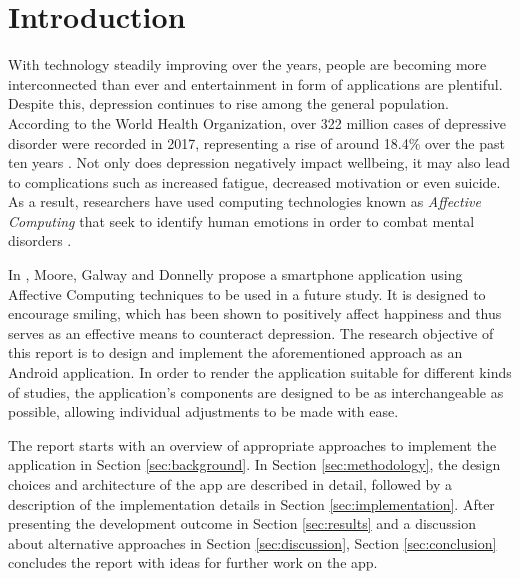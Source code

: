 \section{Introduction} \label{sec:introduction}
With technology steadily improving over the years, people are becoming more interconnected than ever and entertainment in form of applications are plentiful. Despite this, depression continues to rise among the general population.
According to the World Health Organization, over 322 million cases of depressive disorder were recorded in 2017, representing a rise of around 18.4\% over the past ten years \cite{who_depression}.
Not only does depression negatively impact wellbeing, it may also lead to complications such as increased fatigue, decreased motivation or even suicide.
As a result, researchers have used computing technologies known as \textit{Affective Computing} that seek to identify human emotions in order to combat mental disorders \cite{ieee_affective}.

In \cite{sohappy}, Moore, Galway and Donnelly propose a smartphone application using Affective Computing techniques to be used in a future study.
It is designed to encourage smiling, which has been shown to positively affect happiness and thus serves as an effective means to counteract depression.
The research objective of this report is to design and implement the aforementioned approach as an Android application.
In order to render the application suitable for different kinds of studies, the application's components are designed to be as interchangeable as possible, allowing individual adjustments to be made with ease.

The report starts with an overview of appropriate approaches to implement the application in Section \ref{sec:background}.
In Section \ref{sec:methodology}, the design choices and architecture of the app are described in detail, followed by a description of the implementation details in Section \ref{sec:implementation}.
After presenting the development outcome in Section \ref{sec:results} and a discussion about alternative approaches in Section \ref{sec:discussion}, Section \ref{sec:conclusion} concludes the report with ideas for further work on the app.

